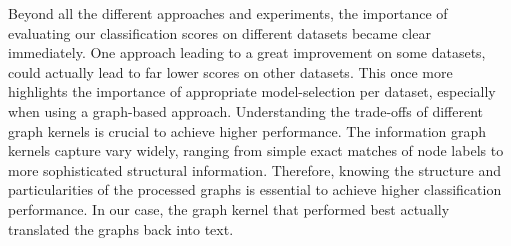 Beyond all the different approaches and experiments, the importance of evaluating our classification scores on different datasets became clear immediately.
One approach leading to a great improvement on some datasets, could actually lead to far lower scores on other datasets.
This once more highlights the importance of appropriate model-selection per dataset, especially when using a graph-based approach.
Understanding the trade-offs of different graph kernels is crucial to achieve higher performance.
The information graph kernels capture vary widely, ranging from simple exact matches of node labels to more sophisticated structural information.
Therefore, knowing the structure and particularities of the processed graphs is essential to achieve higher classification performance.
In our case, the graph kernel that performed best actually translated the graphs back into text.

